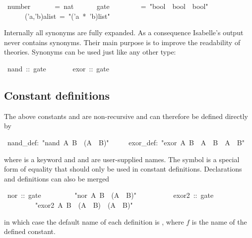 \begin{isabelle}%
~number~~~~~~~=~nat\isanewline
~~~~~~gate~~~~~~~~~=~{"}bool~{\isasymRightarrow}~bool~{\isasymRightarrow}~bool{"}\isanewline
~~~~~~('a,'b)alist~=~{"}('a~*~'b)list{"}%
\begin{isamarkuptext}%
\noindent{}%
Internally all synonyms are fully expanded.  As a consequence Isabelle's
output never contains synonyms.  Their main purpose is to improve the
readability of theories.  Synonyms can be used just like any other
type:%
\end{isamarkuptext}%
~nand~::~gate\isanewline
~~~~~~~exor~::~gate%
\begin{isamarkuptext}%
\subsection{Constant definitions}
\label{sec:ConstDefinitions}

The above constants  and  are non-recursive and can
therefore be defined directly by%
\end{isamarkuptext}%
~nand\_def:~{"}nand~A~B~{\isasymequiv}~{\isasymnot}(A~{\isasymand}~B){"}\isanewline
~~~~~exor\_def:~{"}exor~A~B~{\isasymequiv}~A~{\isasymand}~{\isasymnot}B~{\isasymor}~{\isasymnot}A~{\isasymand}~B{"}%
\begin{isamarkuptext}%
\noindent%
where  is a keyword and  and
 are user-supplied names.
The symbol  is a special form of equality
that should only be used in constant definitions.
Declarations and definitions can also be merged%
\end{isamarkuptext}%
~nor~::~gate\isanewline
~~~~~~~~~{"}nor~A~B~{\isasymequiv}~{\isasymnot}(A~{\isasymor}~B){"}\isanewline
~~~~~~~~~~exor2~::~gate\isanewline
~~~~~~~~~{"}exor2~A~B~{\isasymequiv}~(A~{\isasymor}~B)~{\isasymand}~({\isasymnot}A~{\isasymor}~{\isasymnot}B){"}%
\begin{isamarkuptext}%
\noindent{}%
in which case the default name of each definition is , where
$f$ is the name of the defined constant.%
\end{isamarkuptext}%
\end{isabelle}%
